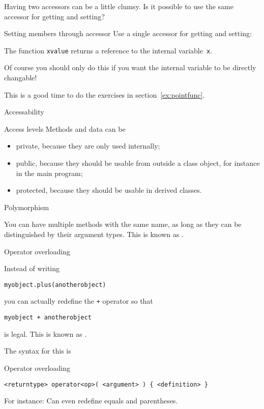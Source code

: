 Having two accessors can be a little clumsy. Is it possible to use the
same accessor for getting and setting?

\begin{block}{Setting members through accessor}
  \label{sl:setmember}
  Use a single accessor for getting and setting:

  The function \lstinline{xvalue} returns a reference to the internal
  variable~\lstinline{x}.
\end{block}

Of course you should only do this if you want the internal variable to
be directly changable!

\begin{exercise}
  This is a good time to do the exercises in section~\ref{ex:pointfunc}.
\end{exercise}

 {Accessability}

\begin{block}{Access levels}
  \label{sl:private-etc}
  Methods and data can be 
  \begin{itemize}
  \item private, because they are only used internally;
  \item public, because they should be usable from outside a class
    object, for instance in the main program;
  \item protected, because they should be usable in derived classes.
  \end{itemize}
\end{block}

 {Polymorphism}

You can have multiple methods with the same name, as long as they can
be distinguished by their argument types. This is known as .

 {Operator overloading}
\label{sec:operatordef}

Instead of writing 
\begin{lstlisting}
myobject.plus(anotherobject)
\end{lstlisting}
you can actually redefine the \lstinline{+} operator so that
\begin{lstlisting}
myobject + anotherobject
\end{lstlisting}
is legal. This is known as .

The syntax for this is
\begin{block}{Operator overloading}
  \label{sl:object-operator}
\begin{lstlisting}
<returntype> operator<op>( <argument> ) { <definition> }
\end{lstlisting}
For instance:
%
%
Can even redefine equals and parentheses.
\end{block}

